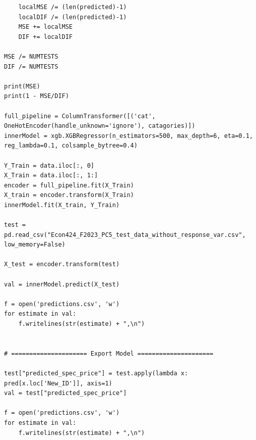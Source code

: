 \documentclass{article}
\begin{document}
\begin{lstlisting}
    localMSE /= (len(predicted)-1)
    localDIF /= (len(predicted)-1)
    MSE += localMSE
    DIF += localDIF

MSE /= NUMTESTS
DIF /= NUMTESTS

print(MSE)
print(1 - MSE/DIF)

full_pipeline = ColumnTransformer([('cat', OneHotEncoder(handle_unknown='ignore'), catagories)])
innerModel = xgb.XGBRegressor(n_estimators=500, max_depth=6, eta=0.1, reg_lambda=0.1, colsample_bytree=0.4)

Y_Train = data.iloc[:, 0]
X_Train = data.iloc[:, 1:]
encoder = full_pipeline.fit(X_Train)
X_train = encoder.transform(X_Train)
innerModel.fit(X_train, Y_Train)

test = pd.read_csv("Econ424_F2023_PC5_test_data_without_response_var.csv", low_memory=False)

X_test = encoder.transform(test)

val = innerModel.predict(X_test)

f = open('predictions.csv', 'w')
for estimate in val:
    f.writelines(str(estimate) + ",\n")


# ===================== Export Model =====================

test["predicted_spec_price"] = test.apply(lambda x: pred[x.loc['New_ID']], axis=1)
val = test["predicted_spec_price"]

f = open('predictions.csv', 'w')
for estimate in val:
    f.writelines(str(estimate) + ",\n")

\end{lstlisting}
\end{document}
